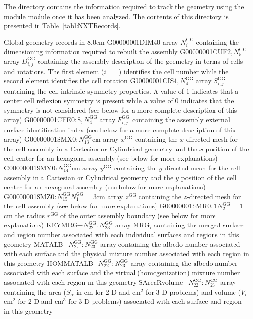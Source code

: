 The  directory contains the information required to track the geometry using the  module module once it has been analyzed. The contents of this directory is presented in Table~\ref{tabl:NXTRecords}.

\begin{DescriptionEnregistrement}{Global geometry records in }{8.0cm}\label{tabl:NXTRecords}
\IntEnr
  {G00000001DIM}{$40$}
  {array $N^{\text{GG}}_{i}$ containing the dimensioning information required to rebuilt the assembly} 
\IntEnr
  {G00000001CUF}{$2,N^{\text{GG}}_{5}$}
  {array $D^{\text{GG}}_{i,j}$ containing the assembly description of the geometry in terms of cells and rotations. The first element ($i=1$) identifies the cell number while the second element identifies the cell rotation} 
\IntEnr
  {G00000001CIS}{$4,N^{\text{GG}}_{4}$}
  {array $S^{\text{GG}}_{i,j}$ containing the cell intrinsic symmetry properties. A value of $1$ indicates that a center cell reflexion symmetry is present while a value of $0$ indicates that the symmetry is not considered (see below for a more complete description of this array)} 
\IntEnr
  {G00000001CFE}{$0:8,N^{\text{GG}}_{4}$}
  {array $F^{\text{GG}}_{i,j}$ containing the assembly external surface identification index (see below for a more complete description of this array)}
\DbleEnr
  {G00000001SMX}{$0:N^{\text{GG}}_{13}$}{cm}
  {array $x^{\text{GG}}$ containing the $x$-directed mesh for the cell assembly in a Cartesian or Cylindrical geometry and the $x$ position of the cell center for an hexagonal assembly (see below for more explanations)}
\DbleEnr
  {G00000001SMY}{$0:N^{\text{GG}}_{14}$}{cm}
  {array $y^{\text{GG}}$ containing the $y$-directed mesh for the cell assembly in a Cartesian or Cylindrical geometry and the $y$ position of the cell center for an hexagonal assembly (see below for more explanations)}
\OptDbleEnr
  {G00000001SMZ}{$0:N^{\text{GG}}_{15}$}{$N^{\text{GG}}_{1}=3$}{cm}
  {array $z^{\text{GG}}$ containing the $z$-directed mesh for the cell assembly (see below for more explanations)}
\OptDbleEnr
  {G00000001SMR}{$0:1$}{$N^{\text{GG}}_{2}=1$}{cm}
  {the radius $r^{\text{GG}}$ of the outer assembly boundary (see below for more explanations)}
\IntEnr
  {KEYMRG}{$-N^{\text{GG}}_{22}:N^{\text{GG}}_{23}$}
  {array $\text{MRG}_{i}$ containing the merged surface and region number associated with each individual surfaces and regions in this geometry}
\IntEnr
  {MATALB}{$-N^{\text{GG}}_{22}:N^{\text{GG}}_{23}$}
  {array containing the albedo number associated with each surface and the physical mixture number associated with each region in this geometry}
\IntEnr
  {HOMMATALB}{$-N^{\text{GG}}_{22}:N^{\text{GG}}_{23}$}
  {array containing the albedo number associated with each surface and the virtual (homogenization) mixture number associated with each region in this geometry}
\DbleEnr
  {SAreaRvolume}{$-N^{\text{GG}}_{22}:N^{\text{GG}}_{23}$}{}
  {array containing the area ($S_{\alpha}$ in cm for 2-D and cm$^{2}$ for 3-D problems) and volume ($V_{i}$ cm$^{2}$ for 2-D and
cm$^{3}$ for 3-D problems) associated with each surface and region in this geometry}
\end{DescriptionEnregistrement}

